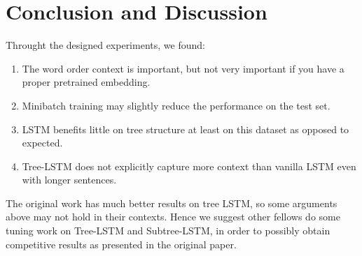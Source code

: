\section{Conclusion and Discussion}
\label{sec: conclusion}
Throught the designed experiments, we found:
\begin{enumerate}
    \vspace{-5pt}
    \item The word order context is important, but not very important if you
    have a proper pretrained embedding.
    \vspace{-7pt}
    \item Minibatch training may slightly reduce the performance on the test
    set.
    \vspace{-7pt}
    \item LSTM benefits little on tree structure at least on this dataset as
    opposed to expected.
    \vspace{-7pt}
    \item Tree-LSTM does not explicitly capture more context than vanilla LSTM
    even with longer sentences.
\end{enumerate}
The original work\cite{tai2015improved} has much better results on tree LSTM, so
some arguments above may not hold in their contexts. Hence we suggest other
fellows do some tuning work on Tree-LSTM and Subtree-LSTM, in order to possibly
obtain competitive results as presented in the original paper.